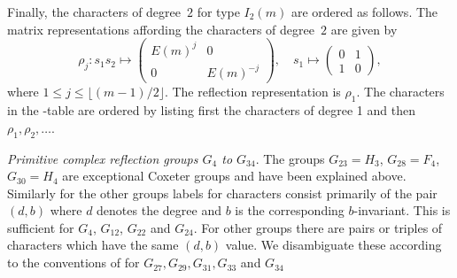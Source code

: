 Finally,  the characters  of degree~$2$  for type  $I_2(m)$ are  ordered as
follows.  The matrix representations affording the characters of degree~$2$
are given by\:
$$ \rho_j \colon s_1s_2 \mapsto
\left(\begin{array}{cc}E(m)^j&0\\0&E(m)^{-j}\end{array}\right),
\quad s_1\mapsto\left(\begin{array}{cc}0&1\\1&0\end{array}\right),$$
where  $1 \le j \le  \lfloor (m-1)/2\rfloor$. The reflection representation
is  $\rho_1$. The  characters in  the \CHEVIE-table  are ordered by listing
first the characters of degree 1 and then $\rho_1,\rho_2,\ldots$.

\smallskip
{\em Primitive complex reflection groups $G_4$ to $G_{34}$}.
The groups $G_{23}=H_3$, $G_{28}=F_4$, $G_{30}=H_4$ are exceptional Coxeter
groups and have been explained above. Similarly for the other groups labels
for  characters consist primarily of the pair $(d,b)$ where $d$ denotes the
degree  and $b$ is the corresponding  $b$-invariant. This is sufficient for
$G_4$, $G_{12}$, $G_{22}$ and $G_{24}$. For other groups there are pairs or
triples  of characters which  have the same  $(d,b)$ value. We disambiguate
these  according to  the conventions  of \cite{Mal00}  for $G_{27}, G_{29},
G_{31}, G_{33}$ and $G_{34}$\:

